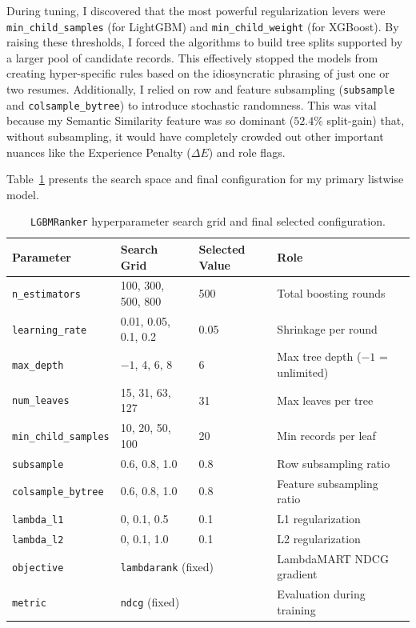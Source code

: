 During tuning, I discovered that the most powerful regularization levers were \texttt{min\_child\_samples} (for LightGBM) and \texttt{min\_child\_weight} (for XGBoost). By raising these thresholds, I forced the algorithms to build tree splits supported by a larger pool of candidate records. This effectively stopped the models from creating hyper-specific rules based on the idiosyncratic phrasing of just one or two resumes. Additionally, I relied on row and feature subsampling (\texttt{subsample} and \texttt{colsample\_bytree}) to introduce stochastic randomness. This was vital because my Semantic Similarity feature was so dominant ($52.4\%$ split-gain) that, without subsampling, it would have completely crowded out other important nuances like the Experience Penalty ($\Delta E$) and role flags.

Table~\ref{tab:lgbm_hyperparams} presents the search space and final configuration for my primary listwise model.

\begin{table}[htbp]
\centering
\caption{\texttt{LGBMRanker} hyperparameter search grid and final selected configuration.}
\label{tab:lgbm_hyperparams}
\small
\begin{tabular}{@{}llll@{}}
\toprule
\textbf{Parameter} & \textbf{Search Grid} & \textbf{Selected Value} & \textbf{Role} \\
\midrule
\texttt{n\_estimators}       & 100, 300, 500, 800    & 500   & Total boosting rounds \\
\texttt{learning\_rate}      & 0.01, 0.05, 0.1, 0.2 & 0.05  & Shrinkage per round \\
\texttt{max\_depth}          & $-1$, 4, 6, 8         & 6     & Max tree depth ($-1$ = unlimited) \\
\texttt{num\_leaves}         & 15, 31, 63, 127       & 31    & Max leaves per tree \\
\texttt{min\_child\_samples} & 10, 20, 50, 100       & 20    & Min records per leaf \\
\texttt{subsample}           & 0.6, 0.8, 1.0         & 0.8   & Row subsampling ratio \\
\texttt{colsample\_bytree}   & 0.6, 0.8, 1.0         & 0.8   & Feature subsampling ratio \\
\texttt{lambda\_l1}          & 0, 0.1, 0.5           & 0.1   & L1 regularization \\
\texttt{lambda\_l2}          & 0, 0.1, 1.0           & 0.1   & L2 regularization \\
\texttt{objective}           & \multicolumn{2}{l}{\texttt{lambdarank} (fixed)} & LambdaMART NDCG gradient \\
\texttt{metric}              & \multicolumn{2}{l}{\texttt{ndcg} (fixed)}        & Evaluation during training \\
\bottomrule
\end{tabular}
\end{table}

